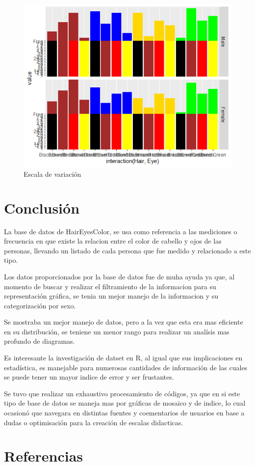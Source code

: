 \documentclass[12pt,a4paper]{article}
\begin{document}
\begin{figure}
\centering
\includegraphics[scale=0.8]{Escala}
\caption{Escala de variación}
\label{fig:Escala}
\end{figure}

\newpage
\section{Conclusión}
La base de datos de HairEyesColor, se usa como referencia a las mediciones o frecuencia en que existe la relacion entre el color de cabello y ojos de las personas, llevando un listado de cada persona que fue medido y relacionado a este tipo. 

Los datos proporcionados por la base de datos fue de muha ayuda ya que, al momento de buscar y realizar el filtramiento de la informacion para su representación gráfica, se tenia un mejor manejo de la informacion y su categorización por sexo.

Se mostraba un mejor manejo de datos, pero a la vez que esta era mas eficiente en su distribución, se teniene un menor rango para realizar un analísis mas profundo de diagramas.

Es interesante la investigación de datset en R, al igual que sus implicaciones en estadística, es manejable para numerosas cantidades de información de las cuales se puede tener un mayor indice de error y ser frustantes.

Se tuvo que realizar un exhaustivo procesamiento de códigos, ya que en si este tipo de base de datos se maneja mas por gráficas de mosaico y de indice, lo cual ocasionó que navegara en distintas fuentes y coementarios de usuarios en base a dudas o optimisación para la creación de escalas didacticas.\citep{repositorio}



\newpage

\section{Referencias}



\end{document}
